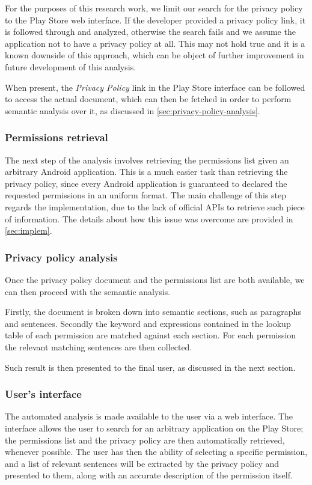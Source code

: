 \documentclass[twoside,letterpaper]{soups}
\theoremstyle{definition}
\begin{document}
For the purposes of this research work, we limit our search for the privacy policy to the Play Store web interface. If the developer provided a privacy policy link, it is followed through and analyzed, otherwise the search fails and we assume the application not to have a privacy policy at all. This may not hold true and it is a known downside of this approach, which can be object of further improvement in future development of this analysis.

When present, the \emph{Privacy Policy} link in the Play Store interface can be followed to access the actual document, which can then be fetched in order to perform semantic analysis over it, as discussed in \autoref{sec:privacy-policy-analysis}.

\subsubsection{Permissions retrieval}
The next step of the analysis involves retrieving the permissions list given an arbitrary Android application. This is a much easier task than retrieving the privacy policy, since every Android application is guaranteed to declared the requested permissions in an uniform format. The main challenge of this step regards the implementation, due to the lack of official APIs to retrieve such piece of information. The details about how this issue was overcome are provided in \autoref{sec:implem}.

\subsubsection{Privacy policy analysis}
\label{sec:privacy-policy-analysis}
Once the privacy policy document and the permissions list are both available, we can then proceed with the semantic analysis.

Firstly, the document is broken down into semantic sections, such as paragraphs and sentences.
Secondly the keyword and expressions contained in the lookup table of each permission are matched against each section.
For each permission the relevant matching sentences are then collected.

Such result is then presented to the final user, as discussed in the next section.

\subsubsection{User's interface}
The automated analysis is made available to the user via a web interface. The interface allows the user to search for an arbitrary application on the Play Store; the permissions list and the privacy policy are then automatically retrieved, whenever possible.
The user has then the ability of selecting a specific permission, and a list of relevant sentences will be extracted by the privacy policy and presented to them, along with an accurate description of the permission itself.
\end{document}
